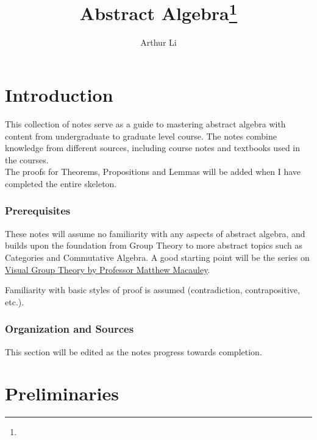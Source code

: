 \documentclass[a4paper,sfsidenotes,openany]{tufte-book}
\title{Abstract Algebra\thanks{}}
\author[Arthur Li]{Arthur Li}
\theoremstyle{theorem}
\begin{document}
\frontmatter

\maketitle



\chapter*{Introduction}
\newthought
{This collection} of notes serve as a guide to mastering abstract algebra with content from undergraduate to graduate level course. The notes combine knowledge from different sources, including course notes and textbooks used in the courses.\\

The proofs for Theorems, Propositions and Lemmas will be added when I have completed the entire skeleton.
	
\subsection{Prerequisites}
These notes will assume no familiarity with any aspects of abstract algebra, and builds upon the foundation from Group Theory to more abstract topics such as Categories and Commutative Algebra. A good starting point will be the series on  \href{https://www.youtube.com/watch?v=UwTQdOop-nU&list=PLwV-9DG53NDxU337smpTwm6sef4x-SCLv}{Visual Group Theory by Professor Matthew Macauley}.
	
Familiarity with basic styles of proof is assumed (contradiction, contrapositive, etc.).
	
\subsection{Organization and Sources}
This section will be edited as the notes progress towards completion.

\tableofcontents

\mainmatter

\chapter{Preliminaries}
\end{document}
